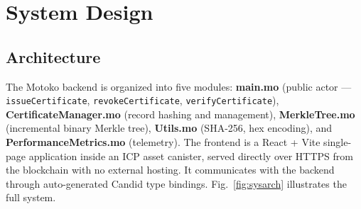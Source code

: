 \documentclass[conference]{IEEEtran}
\begin{document}
\section{System Design}
\label{sec:design}

\subsection{Architecture}
The Motoko backend is organized into five modules: \textbf{main.mo} (public actor — \texttt{issueCertificate}, \texttt{revokeCertificate}, \texttt{verifyCertificate}), \textbf{CertificateManager.mo} (record hashing and management), \textbf{MerkleTree.mo} (incremental binary Merkle tree), \textbf{Utils.mo} (SHA-256, hex encoding), and \textbf{PerformanceMetrics.mo} (telemetry). The frontend is a React + Vite single-page application inside an ICP asset canister, served directly over HTTPS from the blockchain with no external hosting. It communicates with the backend through auto-generated Candid type bindings. Fig.~\ref{fig:sysarch} illustrates the full system.
\end{document}
